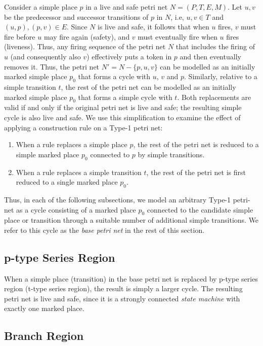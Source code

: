 \documentclass[12pt,a4paper]{article}
\begin{document}
Consider a simple place $p$ in a live and safe petri net $N =
(P,T,E,M)$. Let $u,v$ be the predecessor and successor transitions of
$p$ in $N$, i.e, $u,v \in T$ and $(u,p), (p,v)\in E$. Since $N$ is
live and safe, it follows that when $u$ fires, $v$ must fire before
$u$ may fire again (safety), and $v$ must eventually fire when $u$
fires (liveness). Thus, any firing sequence of the petri net $N$ that
includes the firing of $u$ (and consequently also $v$) effectively
puts a token in $p$ and then eventually removes it. Thus, the petri
net $N' = N - \{p,u,v\}$ can be modelled as an initially marked simple
place $p_0$ that forms a cycle with $u$, $v$ and $p$. Similarly,
relative to a simple transition $t$, the rest of the petri net can be
modelled as an initially marked simple place $p_0$ that forms a simple
cycle with $t$. Both replacements are valid if and only if the
original petri net is live and safe; the resulting simple cycle is
also live and safe. We use this simplification to examine the effect
of applying a construction rule on a Type-1 petri net:

\begin{enumerate}
\item When a rule replaces a simple place $p$, the rest of the petri
  net is reduced to a simple marked place $p_0$ connected to $p$ by
  simple transitions.
\item When a rule replaces a simple transition $t$, the rest of the
  petri net is first reduced to a single marked place $p_0$.
\end{enumerate}

Thus, in each of the following subsections, we model an arbitrary
Type-1 petri-net as a cycle consisting of a marked place $p_0$
connected to the candidate simple place or transition through a
suitable number of additional simple transitions. We refer to this
cycle as the \emph{base petri net} in the rest of this section.

\subsection{p-type Series Region}
\label{sec:series-live-and-safe}

When a simple place (transition) in the base petri net is replaced by
p-type series region (t-type series region), the result is simply a
larger cycle. The resulting petri net is live and safe, since it is a
strongly connected \emph{state machine} with exactly one marked place.

\subsection{Branch Region}
\label{sec:branch-live-and-safe}
\end{document}
